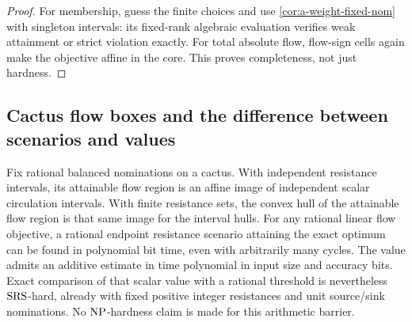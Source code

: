 \begin{proof}
For membership, guess the finite choices and use
\cref{cor:a-weight-fixed-nom} with singleton intervals: its fixed-rank
algebraic evaluation verifies weak attainment or strict violation exactly.
For total absolute flow, flow-sign cells again make the objective affine
in the core. This proves completeness, not just hardness.
\end{proof}

\subsection{Cactus flow boxes and the difference between scenarios and values}

\begin{theorem}
\label{thm:a-weight-cactus-region}
Fix rational balanced nominations on a cactus. With independent resistance
intervals, its attainable flow region is an affine image of independent
scalar circulation intervals. With finite resistance sets, the convex hull
of the attainable flow region is that same image for the interval hulls.
For any rational linear flow objective, a rational endpoint resistance
scenario attaining the exact optimum can be found in polynomial bit time,
even with arbitrarily many cycles. The value admits an additive estimate
in time polynomial in input size and accuracy bits. Exact comparison of
that scalar value with a rational threshold is nevertheless $\mathrm{SRS}$-hard,
already with fixed positive integer resistances and unit source/sink
nominations. No $\mathrm{NP}$-hardness claim is made for this arithmetic barrier.
\end{theorem}
